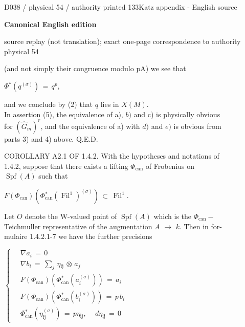 \documentclass[9pt]{article}
\newcommand{\CanonHeading}[1]{\par\vspace{1.5pt}{\fontsize{8.6}{10.0}\selectfont\sffamily\bfseries\color{Accent} #1\par}\vspace{1.5pt}}
\newcommand{\CanonText}[1]{\par{\fontsize{8.0}{9.35}\selectfont\RaggedRight #1\par}\vspace{2.2pt}}
\newcommand{\CanonDisplay}[1]{\par\vspace{1.2pt}\begin{center}{\fontsize{7.2}{8.4}\selectfont\(\displaystyle #1\)}\end{center}\vspace{1.2pt}}
\newenvironment{CanonMathBlock}{\par\vspace{1.2pt}\begin{center}\fontsize{6.8}{8.0}\selectfont\(\displaystyle}{\)\end{center}\vspace{1.2pt}}
\newcommand{\LayerTitle}{Canonical English edition}
\begin{document}
\noindent\begin{minipage}[t][\dimexpr\textheight-5pt\relax][t]{\textwidth}
{\sffamily\fontsize{7.3}{8.2}\selectfont\color{Quiet} D038 / physical 54 / authority printed 133\hfill Katz appendix - English source}
\par{}\vspace{4.5pt}
{\sffamily\fontsize{10.4}{11.6}\selectfont\bfseries\color{Accent} \LayerTitle}
\par{\sffamily\fontsize{6.7}{7.7}\selectfont\color{Quiet} source replay (not translation); exact one-page correspondence to authority physical 54}
\vspace{5pt}
\CanonText{(and not simply their congruence modulo pA) we see that}
\CanonDisplay{\Phi{}^{*}(q^{(\sigma{})})\,=\,q^{p},}
\CanonText{and we conclude by (2) that \(q\) lies in \(X(M)\).\\In assertion (5), the equivalence of a), \(b)\) and c) is physically obvious\\for \((\widehat{G}_{m})^{r}\), and the equivalence of a) with \(d)\) and \(e)\) is obvious from\\parts 3) and 4) above. Q.E.D.}
\CanonHeading{A2. SHARPENINGS OF 1.4}
\CanonText{COROLLARY A2.1 OF 1.4.2. With the hypotheses and notations of\\1.4.2, suppose that there exists a lifting \(\Phi{}_{\mathrm{can}}\) of Frobenius on\\\(\operatorname{Spf}(A)\) such that}
\CanonDisplay{F(\Phi{}_{\mathrm{can}})(\Phi{}_{\mathrm{can}}^{*}(\operatorname{Fil}^{1})^{(\sigma{})})\,\subset{}\,\operatorname{Fil}^{1}.}
\CanonText{Let \(O\) denote the W-valued point of \(\operatorname{Spf}(A)\) which is the \(\Phi{}_{\mathrm{can}}-\)\\Teichmuller representative of the augmentation \(A\) \(\to{}\) \(k\). Then in for-\\mulaire 1.4.2.1-7 we have the further precisions}
\begin{CanonMathBlock}
\left\{\begin{aligned}
& \,\nabla{}a_{i}\,=\,0\\& \,\nabla{}b_{i}\,=\,\sum_{j}\,\eta{}_{\mathrm{ij}}\,\otimes{}\,a_{j}\\& \,F(\Phi{}_{\mathrm{can}})(\Phi{}_{\mathrm{can}}^{*}(a_{i}^{(\sigma{})}))\,=\,a_{i}\\& \,F(\Phi{}_{\mathrm{can}})(\Phi{}_{\mathrm{can}}^{*}(b_{i}^{(\sigma{})}))\,=\,p\,b_{i}\\& \,\Phi{}_{\mathrm{can}}^{*}(\eta{}_{\mathrm{ij}}^{(\sigma{})})\,=\,p\eta{}_{\mathrm{ij}},\quad\,d\eta{}_{\mathrm{ij}}\,=\,0

\end{aligned}
\end{CanonMathBlock}
\end{minipage}
\end{document}
